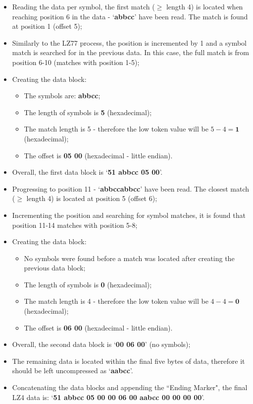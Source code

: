 \documentclass[12pt]{article}
\begin{document}
\begin{itemize}
	\item Reading the data per symbol, the first match ($\geq$ length 4) is located when reaching position 6 in the data - `\textbf{abbcc}' have been read. The match is found at position 1 (offset 5);
	\item Similarly to the LZ77 process, the position is incremented by 1 and a symbol match is searched for in the previous data. In this case, the full match is from position 6-10 (matches with position 1-5);
	\item Creating the data block:
		\begin{itemize}
			\item The symbols are: \textbf{abbcc};
			\item The length of symbols is \textbf{5} (hexadecimal);
			\item The match length is 5 - therefore the low token value will be $5-4=\textbf{1}$ (hexadecimal);
			\item The offset is \textbf{05 00} (hexadecimal - little endian).
		\end{itemize}
	\item Overall, the first data block is `\textbf{51 abbcc 05 00}'.
	\item Progressing to position 11 - `\textbf{abbccabbcc}' have been read. The closest match ($\geq$ length 4) is located at position 5 (offset 6);
	\item Incrementing the position and searching for symbol matches, it is found that position 11-14 matches with position 5-8;
	\item Creating the data block:
		\begin{itemize}
			\item No symbols were found before a match was located after creating the previous data block;
			\item The length of symbols is \textbf{0} (hexadecimal);
			\item The match length is 4 - therefore the low token value will be $4-4=\textbf{0}$ (hexadecimal);
			\item The offset is \textbf{06 00} (hexadecimal - little endian).
		\end{itemize}
	\item Overall, the second data block is `\textbf{00 06 00}' (no symbols);
	\item The remaining data is located within the final five bytes of data, therefore it should be left uncompressed as `\textbf{aabcc}'.
	\item Concatenating the data blocks and appending the ``Ending Marker", the final LZ4 data is: `\textbf{51 abbcc 05 00 00 06 00 aabcc 00 00 00 00}'.
\end{itemize}
\end{document}

